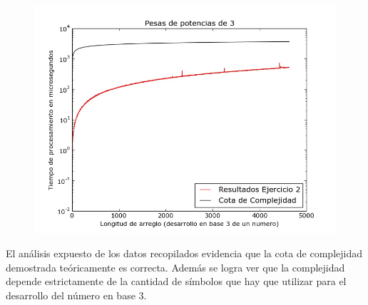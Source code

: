     \renewcommand\constante{5}

	\begin{figure}[H]
      \begin{center}
        \includegraphics[width=0.7\columnwidth]{imagenes/ej2Nuevo.jpeg}
        \caption{}
      \end{center}
  \end{figure}

El análisis expuesto de los datos recopilados evidencia que la cota de complejidad
demostrada teóricamente es correcta. Además se logra ver que la complejidad depende estrictamente de la cantidad
de símbolos que hay que utilizar para el desarrollo del número en base 3.
